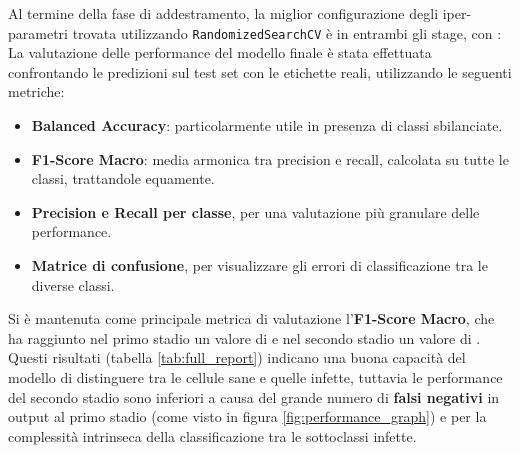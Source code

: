 \documentclass[minted, draw]{../tex/hebdomon}
\newif\ifshowcode
\begin{document}

Al termine della fase di addestramento, la miglior configurazione degli iper-parametri trovata utilizzando \texttt{RandomizedSearchCV} è  in entrambi gli stage, con :\\
\ifshowcode
%
\begin{code}{python}
  param_dist = {
        'selector__k': [700],
        'classifier__C': [100],
        'classifier__kernel': ['poly'],
        'classifier__gamma': ['auto'] 
    }
\end{code}
%
\fi
La valutazione delle performance del modello finale è stata effettuata confrontando le predizioni sul test set con le etichette reali, utilizzando le seguenti metriche:

\begin{itemize}
\item \textbf{Balanced Accuracy}: particolarmente utile in presenza di classi sbilanciate.
\item \textbf{F1-Score Macro}: media armonica tra precision e recall, calcolata su tutte le classi, trattandole equamente.
\item \textbf{Precision e Recall per classe}, per una valutazione più granulare delle performance.
\item \textbf{Matrice di confusione}, per visualizzare gli errori di classificazione tra le diverse classi.
\end{itemize}


Si è mantenuta come principale metrica di valutazione l'\textbf{F1-Score Macro}, che ha raggiunto nel primo stadio un valore di  e nel secondo stadio un valore di . Questi risultati (tabella \ref{tab:full_report}) indicano una buona capacità del modello di distinguere tra le cellule sane e quelle infette, tuttavia le performance del secondo stadio sono inferiori a causa del grande numero di \textbf{falsi negativi} in output al primo stadio (come visto in figura \ref{fig:performance_graph}) e per la complessità intrinseca della classificazione tra le sottoclassi infette.
\end{document}
